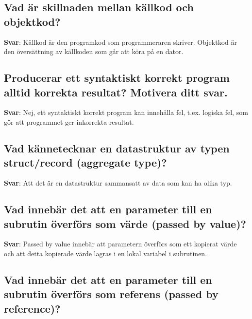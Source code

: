 \documentclass[a4paper,11pt,oneside]{article}
\begin{document}
\begin{sloppypar}
\subsection{Vad \"ar skillnaden mellan k\"allkod och objektkod?}

\label{q:192:sa:sv:True}

\textbf{Svar}: K\"allkod \"ar den programkod som programmeraren skriver. Objektkod \"ar den \"overs\"attning av k\"allkoden som g\r{a}r att k\"ora p\r{a} en dator.



\subsection{Producerar ett syntaktiskt korrekt program alltid korrekta resultat? Motivera ditt svar.}

\label{q:193:sa:sv:True}

\textbf{Svar}: Nej, ett syntaktiskt korrekt program kan inneh\r{a}lla fel, t.ex. logiska fel, som g\"or att programmet ger inkorrekta resultat.



\subsection{Vad k\"annetecknar en datastruktur av typen struct/record (aggregate type)?}

\label{q:194:sa:sv:True}

\textbf{Svar}: Att det \"ar en datastruktur sammansatt av data som kan ha olika typ.



\subsection{Vad inneb\"ar det att en parameter till en subrutin \"overf\"ors som v\"arde (passed by value)?}

\label{q:195:sa:sv:True}

\textbf{Svar}: Passed by value inneb\"ar att parametern \"overf\"ors som ett kopierat v\"arde och att detta kopierade v\"arde lagras i en lokal variabel i subrutinen.



\subsection{Vad inneb\"ar det att en parameter till en subrutin \"overf\"ors som referens (passed by reference)?}


\end{sloppypar}
\end{document}
